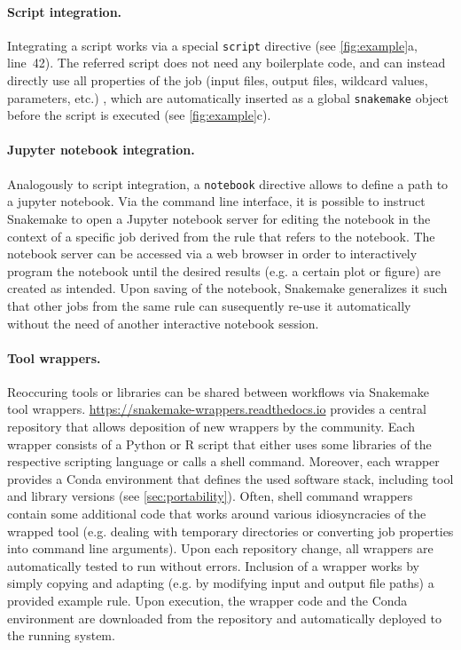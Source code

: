 \documentclass[parskip=half]{scrartcl}
\let\plainurl\url
\renewcommand{\url}[1]{\protect\plainurl{#1}}
\begin{document}
\paragraph{Script integration.}
Integrating a script works via a special \lstinline!script! directive (see \autoref{fig:example}a, line~42).
The referred script does not need any boilerplate code, and can instead directly use all properties of the job (input files, output files, wildcard values, parameters, etc.)
, which are automatically inserted as a global \lstinline!snakemake! object before the script is executed (see \autoref{fig:example}c).

\paragraph{Jupyter notebook integration.}
Analogously to script integration, a \lstinline!notebook! directive allows to define a path to a jupyter notebook.
Via the command line interface, it is possible to instruct Snakemake to open a Jupyter notebook server for editing the notebook in the context of a specific job derived from the rule that refers to the notebook.
The notebook server can be accessed via a web browser in order to interactively program the notebook until the desired results (e.g. a certain plot or figure) are created as intended.
Upon saving of the notebook, Snakemake generalizes it such that other jobs from the same rule can susequently re-use it automatically without the need of another interactive notebook session.

\paragraph{Tool wrappers.}
Reoccuring tools or libraries can be shared between workflows via Snakemake tool wrappers.
\url{https://snakemake-wrappers.readthedocs.io} provides a central repository that allows deposition of new wrappers by the community.
Each wrapper consists of a Python or R script that either uses some libraries of the respective scripting language or calls a shell command.
Moreover, each wrapper provides a Conda environment that defines the used software stack, including tool and library versions (see \autoref{sec:portability}).
Often, shell command wrappers contain some additional code that works around various idiosyncracies of the wrapped tool (e.g. dealing with temporary directories or converting job properties into command line arguments).
Upon each repository change, all wrappers are automatically tested to run without errors.
Inclusion of a wrapper works by simply copying and adapting (e.g. by modifying input and output file paths) a provided example rule.
Upon execution, the wrapper code and the Conda environment are downloaded from the repository and automatically deployed to the running system.
\end{document}

